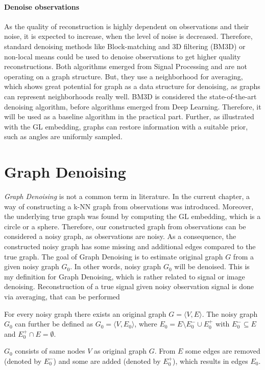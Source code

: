   \paragraph{Denoise observations}
  As the quality of reconstruction is highly dependent on observations and their noise, it
  is expected to increase, when the level of noise is decreased.
  Therefore, standard denoising methods like Block-matching and 3D filtering (BM3D) \cite{bm3d} or 
  non-local means \cite{noneLocalMean} could be used to denoise observations to get higher quality reconstructions.
  Both algorithms emerged from Signal Processing and are not operating on a graph structure. 
  But, they use a neighborhood for averaging, which shows great potential for graph 
  as a data structure for denoising, as graphs can represent neighborhoods really well.
  BM3D is considered the state-of-the-art denoising algorithm, before algorithms emerged from Deep Learning.
  Therefore, it will be used as a baseline algorithm in the practical part.
  Further, as illustrated with the GL embedding, graphs can restore information with a suitable prior,
  such as angles are uniformly sampled.

\section{Graph Denoising}
\textit{Graph Denoising} is not a common term in literature.
In the current chapter, a way of constructing a k-NN graph from observations was introduced.
Moreover, the underlying true graph was found by computing the GL embedding, which is a circle or a sphere.
Therefore, our constructed graph from observations can be considered a noisy graph, 
as observations are noisy. 
As a consequence, the constructed noisy graph has some missing and additional edges compared to the true graph.
The goal of Graph Denoising is to estimate original graph $G$ from a given noisy graph $G_0$.
In other words, noisy graph $G_0$ will be denoised.
This is my definition for Graph Denoising, which is rather related to signal or image denoising.
Reconstruction of a true signal given noisy observation signal is done via averaging, that can be performed

For every noisy graph there exists an original graph $G = \langle V,E \rangle$.
The noisy graph $G_0$ can further be defined as $G_0 = \langle V, E_0 \rangle$,  
 where $E_0 = E \setminus  E^{-}_0 \cup  E^{+}_0$ with $E^{-}_0 \subseteq E$ and $E^{+}_0 \cap E = \emptyset$.

$G_0$ consists of same nodes $V$ as original graph $G$. 
From $E$ some edges are removed (denoted by $E^{-}_0$) and some are added
(denoted by $E^{+}_0$), which results in edges $E_0$.

